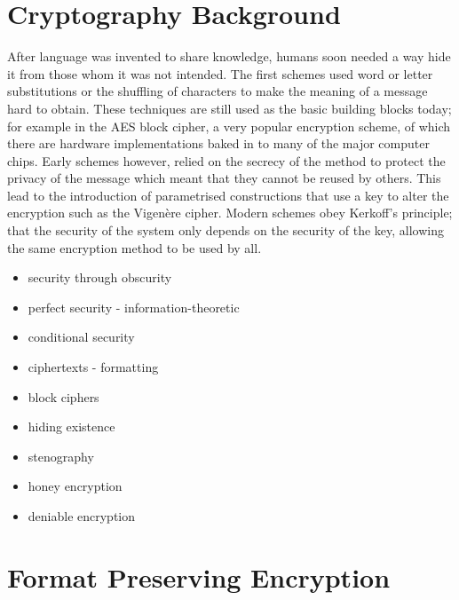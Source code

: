 \documentclass[10pt,a4paper]{article}
\begin{document}
\pagebreak
\section{Cryptography Background}
After language was invented to share knowledge, humans soon needed a way hide it from those whom it was not intended. The first schemes used word or letter substitutions or the shuffling of characters to make the meaning of a message hard to obtain. These techniques are still used as the basic building blocks today; for example in the AES block cipher, a very popular encryption scheme, of which there are hardware implementations baked in to many of the major computer chips. Early schemes however, relied on the secrecy of the method to protect the privacy of the message which meant that they cannot be reused by others. This lead to the introduction of parametrised constructions that use a key to alter the encryption such as the Vigen\`ere cipher. Modern schemes obey Kerkoff's principle; that the security of the system only depends on the security of the key, allowing the same encryption method to be used by all.
\begin{itemize}
 \item security through obscurity
 \item perfect security - information-theoretic
 \item conditional security
 \item ciphertexts - formatting
 \item block ciphers
\end{itemize}

\begin{itemize}
 \item hiding existence
 \item stenography
 \item honey encryption
 \item deniable encryption
\end{itemize}

\pagebreak
\section{Format Preserving Encryption}
\end{document}
